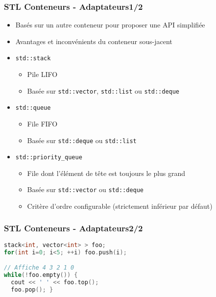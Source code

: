 \documentclass[C++.tex]{subfiles}
\begin{document}
\begin{frame}
	\frametitle{STL Conteneurs - Adaptateurs\titlehfill{}1/2}
	\begin{itemize}
		\item Basés sur un autre conteneur pour proposer une API simplifiée
		\item Avantages et inconvénients du conteneur sous-jacent
		\item \lstinline|std::stack|
		\begin{itemize}
			\item Pile LIFO
			\item Basée sur \lstinline|std::vector|, \lstinline|std::list| ou \lstinline|std::deque|
		\end{itemize} 
		\item \lstinline|std::queue|
		\begin{itemize}
			\item File FIFO
			\item Basée sur \lstinline|std::deque| ou \lstinline|std::list|
		\end{itemize} 
		\item \lstinline|std::priority_queue|
		\begin{itemize}
			\item File dont l'élément de tête est toujours le plus grand
			\item Basée sur \lstinline|std::vector| ou \lstinline|std::deque|
			\item Critère d'ordre configurable (strictement inférieur par défaut)
		\end{itemize} 
	\end{itemize}
\end{frame}

\begin{frame}[fragile]
	\frametitle{STL Conteneurs - Adaptateurs\titlehfill{}2/2}
	\begin{lstlisting}[language=C++]
stack<int, vector<int> > foo;
for(int i=0; i<5; ++i) foo.push(i);

// Affiche 4 3 2 1 0
while(!foo.empty()) {
  cout << ' ' << foo.top();
  foo.pop(); }\end{lstlisting}
\end{frame}
\end{document}
